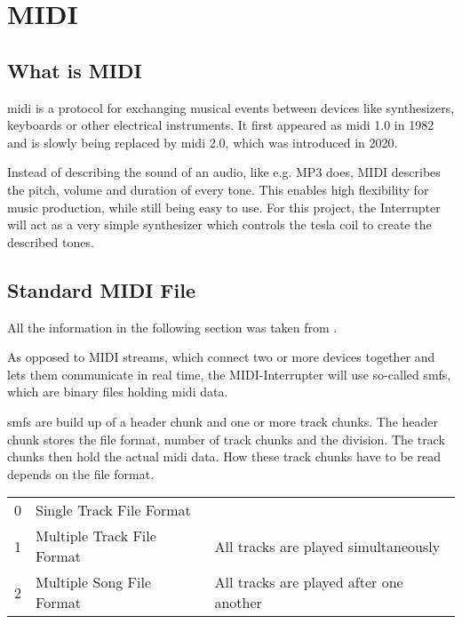 \setchapterpreamble[u]{\margintoc}

\chapter{MIDI}

\section{What is MIDI}

\gls{midi} is a protocol for exchanging musical events between devices like synthesizers, keyboards or other electrical instruments. It first appeared as \gls{midi} 1.0 in 1982 and is slowly being replaced by \gls{midi} 2.0, which was introduced in 2020.

Instead of describing the sound of an audio, like e.g. MP3 does, MIDI describes the pitch, volume and duration of every tone. This enables high flexibility for music production, while still being easy to use. For this project, the Interrupter will act as a very simple synthesizer which controls the tesla coil to create the described tones.

\section{Standard MIDI File}

All the information in the following section was taken from .

As opposed to MIDI streams, which connect two or more devices together and lets them communicate in real time, the MIDI-Interrupter will use so-called \glspl{smf}, which are binary files holding \gls{midi} data.

\glspl{smf} are build up of a header chunk and one or more track chunks. The header chunk stores the file format, number of track chunks and the division. The track chunks then hold the actual \gls{midi} data. How these track chunks have to be read depends on the file format.

\begin{tabular}{cll@{}}
    \midrule
    0 & Single Track File Format   & \\
    1 & Multiple Track File Format & All tracks are played simultaneously\\
    2 & Multiple Song File Format  & All tracks are played after one another\\
    \midrule
\end{tabular}

